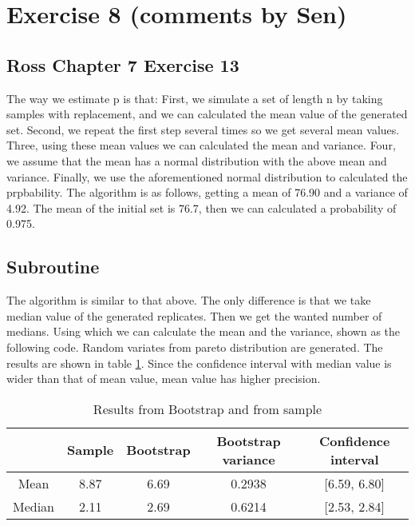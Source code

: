 \section*{Exercise 8 (comments by Sen)}
\subsection*{Ross Chapter 7 Exercise 13}
The way we estimate p is that: First, we simulate a set of length n by taking samples with replacement, and we can calculated the mean value of the generated set. Second, we repeat the first step several times so we get several mean values. Three, using these mean values we can calculated the mean and variance. Four, we assume that the mean has a normal distribution with the above mean and variance. Finally, we use the aforementioned normal distribution to calculated the prpbability. The algorithm is as follows, getting a mean of 76.90 and a variance of 4.92. The mean of the initial set is 76.7, then we can calculated a probability of 0.975.

\subsection*{Subroutine}
The algorithm is similar to that above. The only difference is that we take median value of the generated replicates. Then we get the wanted number of medians. Using which we can calculate the mean and the variance, shown as the following code. Random variates from pareto distribution are generated. The results are shown in table \ref{tab:ex8}. Since the confidence interval with median value is wider than that of mean value, mean value has higher precision.

\begin{table}[h]
    \centering
    \begin{tabular}{|c|c|c|c|c|} \hline
         & Sample  & Bootstrap  & Bootstrap variance & Confidence interval\\ \hline
       Mean  &8.87 & 6.69 &0.2938 & [6.59, 6.80]\\ \hline
       Median  & 2.11& 2.69 &0.6214 & [2.53, 2.84]\\ \hline
    \end{tabular}
    \caption{Results from Bootstrap and from sample}
    \label{tab:ex8}
\end{table}
